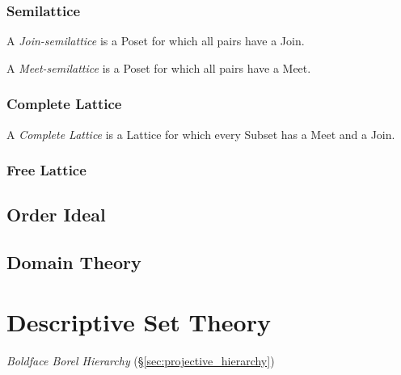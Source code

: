\subsubsection{Semilattice}\label{sec:semilattice}

A \emph{Join-semilattice} is a Poset for which all pairs have a Join.

A \emph{Meet-semilattice} is a Poset for which all pairs have a Meet.



\subsubsection{Complete Lattice}\label{sec:complete_lattice}

A \emph{Complete Lattice} is a Lattice for which every Subset has a
Meet and a Join.



\subsubsection{Free Lattice}



\subsection{Order Ideal}\label{sec:order_ideal}



\subsection{Domain Theory}\label{sec:domain_theory}



\section{Descriptive Set Theory}

\emph{Boldface Borel Hierarchy} (\S\ref{sec:projective_hierarchy})

